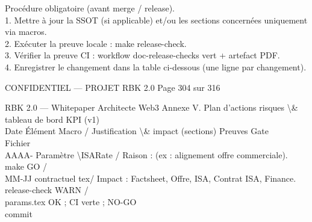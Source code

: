 \vspace{0.5em}
Procédure obligatoire (avant merge / release).\\
\vspace{0.5em}
1. Mettre à jour la SSOT (si applicable) et/ou les sections concernées uniquement via macros.\\
\vspace{0.5em}
2. Exécuter la preuve locale : make release-check.\\
\vspace{0.5em}
3. Vérifier la preuve CI : workflow doc-release-checks vert + artefact PDF.\\
\vspace{0.5em}
4. Enregistrer le changement dans la table ci-dessous (une ligne par changement).\\
\vspace{0.5em}
\vspace{0.5em}
\vspace{0.5em}
\vspace{0.5em}
\begin{confidential}CONFIDENTIEL — PROJET RBK 2.0                                                                Page 304 sur 316\end{confidential}
RBK 2.0 — Whitepaper Architecte Web3                                                                                     Annexe V. Plan d’actions risques \textbackslash{}& tableau de bord KPI (v1)\\
\vspace{0.5em}
\vspace{0.5em}
\vspace{0.5em}
Date           Élément               Macro /               Justification \textbackslash{}& impact (sections)                                                             Preuves        Gate\\
Fichier\\
AAAA-          Paramètre             \textbackslash{}ISARate /            Raison : (ex : alignement offre commerciale).                                                 make            GO /\\
MM-JJ          contractuel           tex/                  Impact : Factsheet, Offre, ISA, Contrat ISA, Finance.                                         release-check WARN /\\
params.tex                                                                                                          OK ; CI verte ; NO-GO\\
commit\\
